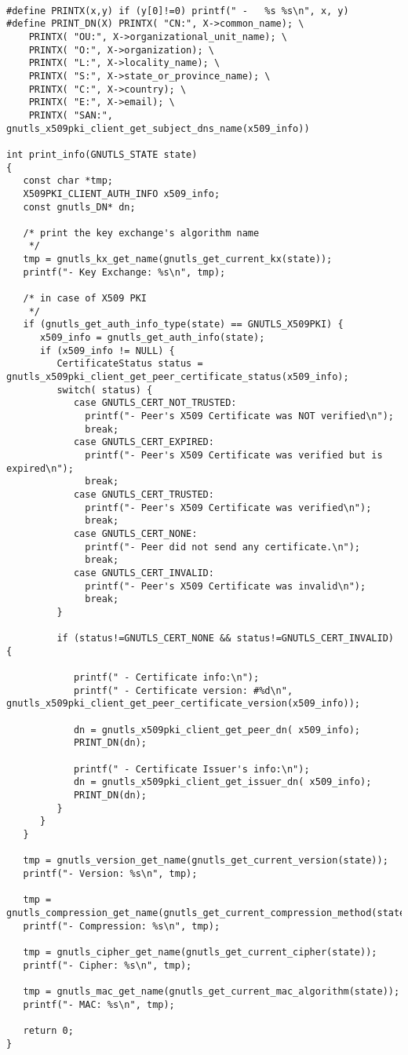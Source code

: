 \begin{verbatim}

#define PRINTX(x,y) if (y[0]!=0) printf(" -   %s %s\n", x, y)
#define PRINT_DN(X) PRINTX( "CN:", X->common_name); \
	PRINTX( "OU:", X->organizational_unit_name); \
	PRINTX( "O:", X->organization); \
	PRINTX( "L:", X->locality_name); \
	PRINTX( "S:", X->state_or_province_name); \
	PRINTX( "C:", X->country); \
	PRINTX( "E:", X->email); \
	PRINTX( "SAN:", gnutls_x509pki_client_get_subject_dns_name(x509_info))

int print_info(GNUTLS_STATE state)
{
   const char *tmp;
   X509PKI_CLIENT_AUTH_INFO x509_info;
   const gnutls_DN* dn;

   /* print the key exchange's algorithm name
    */
   tmp = gnutls_kx_get_name(gnutls_get_current_kx(state));
   printf("- Key Exchange: %s\n", tmp);

   /* in case of X509 PKI
    */
   if (gnutls_get_auth_info_type(state) == GNUTLS_X509PKI) {
      x509_info = gnutls_get_auth_info(state);
      if (x509_info != NULL) {
         CertificateStatus status = gnutls_x509pki_client_get_peer_certificate_status(x509_info);
         switch( status) {
            case GNUTLS_CERT_NOT_TRUSTED:
              printf("- Peer's X509 Certificate was NOT verified\n");
              break;
            case GNUTLS_CERT_EXPIRED:
              printf("- Peer's X509 Certificate was verified but is expired\n");
              break;
            case GNUTLS_CERT_TRUSTED:
              printf("- Peer's X509 Certificate was verified\n");
              break;
            case GNUTLS_CERT_NONE:
              printf("- Peer did not send any certificate.\n");
              break;
            case GNUTLS_CERT_INVALID:
              printf("- Peer's X509 Certificate was invalid\n");
              break;
         }
			
         if (status!=GNUTLS_CERT_NONE && status!=GNUTLS_CERT_INVALID) {

            printf(" - Certificate info:\n");
            printf(" - Certificate version: #%d\n", gnutls_x509pki_client_get_peer_certificate_version(x509_info));

            dn = gnutls_x509pki_client_get_peer_dn( x509_info);
            PRINT_DN(dn);

            printf(" - Certificate Issuer's info:\n");
            dn = gnutls_x509pki_client_get_issuer_dn( x509_info);
            PRINT_DN(dn);
         }
      }
   }

   tmp = gnutls_version_get_name(gnutls_get_current_version(state));
   printf("- Version: %s\n", tmp);

   tmp = gnutls_compression_get_name(gnutls_get_current_compression_method(state));
   printf("- Compression: %s\n", tmp);

   tmp = gnutls_cipher_get_name(gnutls_get_current_cipher(state));
   printf("- Cipher: %s\n", tmp);

   tmp = gnutls_mac_get_name(gnutls_get_current_mac_algorithm(state));
   printf("- MAC: %s\n", tmp);

   return 0;
}

\end{verbatim}
